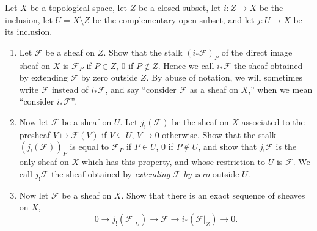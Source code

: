 \begin{exercise}%
	Let $X $ be a topological space, let $Z $ be a closed subset, let $i: Z\to X $ be the inclusion, let $U = X \setminus Z $ be the complementary open subset, and let $j: U\to X $ be its inclusion.
	\begin{enumerate}
		\item Let $\mathscr{F} $ be a sheaf on $Z $. Show that the stalk $(i_\ast \mathscr{F})_P $ of the direct image sheaf on $X $ is $\mathscr{F}_P $ if $P\in Z $, $0 $ if $P\notin Z $. Hence we call $i_\ast \mathscr{F} $ the sheaf obtained by extending $\mathscr{F} $ by zero outside $Z $. By abuse of notation, we will sometimes write $\mathscr{F} $ instead of $i_\ast \mathscr{F} $, and say ``consider $\mathscr{F} $ as a sheaf on $X $,'' when we mean ``consider $i_\ast \mathscr{F}$''.
		\item Now let $\mathscr{F} $ be a sheaf on $U $. Let $j_!(\mathscr{F}) $ be the sheaf on $X $ associated to the presheaf $V\mapsto \mathscr{F}(V) $ if $V\subseteq U $, $V\mapsto 0 $ otherwise. Show that the stalk $(j_!(\mathscr{F}))_P $ is equal to $\mathscr{F}_P $ if $P\in U $, $0 $ if $P\notin U $, and show that $j_! \mathscr{F} $ is the only sheaf on $X $ which has this property, and whose restriction to $U $ is $\mathscr{F} $. We call $j_! \mathscr{F} $ the sheaf obtained by \textit{extending} $\mathscr{F} $ \textit{by zero} outside $U $.
		\item Now let $\mathscr{F} $ be a sheaf on $X $. Show that there is an exact sequence of sheaves on $X $,
			\[
				0 \to j_!(\mathscr{F}|_U) \to \mathscr{F} \to i_\ast(\mathscr{F}|_Z) \to 0
			.\]
	\end{enumerate}
\end{exercise}
